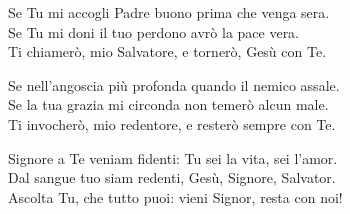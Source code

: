 
\strofa Se Tu mi accogli Padre buono prima che venga sera.\\
Se Tu mi doni il tuo perdono avrò la pace vera.\\
Ti chiamerò, mio Salvatore, e tornerò, Gesù con Te.

\spazio

\strofa Se nell'angoscia più profonda quando il nemico assale.\\
Se la tua grazia mi circonda non temerò alcun male.\\
Ti invocherò, mio redentore, e resterò sempre con Te.

\spazio

\strofa Signore a Te veniam fidenti: Tu sei la vita, sei l'amor.\\
Dal sangue tuo siam redenti, Gesù, Signore, Salvator.\\
Ascolta Tu, che tutto puoi: vieni Signor, resta con noi!